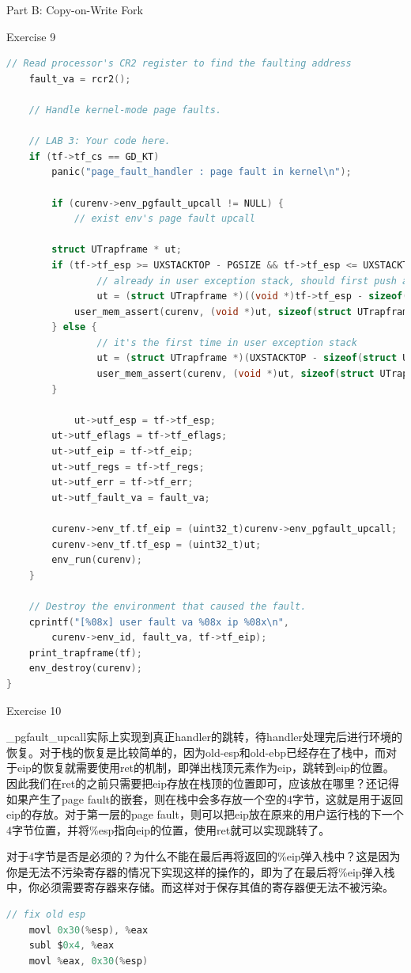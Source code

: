\documentclass[GBK,winfonts,a4paper,10pt]{ctexart}
\begin{document}
\begin{section}{Part B: Copy-on-Write Fork}
\begin{subsection}{Exercise 9}
\begin{lstlisting}[language=C]
	// Read processor's CR2 register to find the faulting address
	fault_va = rcr2();

	// Handle kernel-mode page faults.

	// LAB 3: Your code here.
	if (tf->tf_cs == GD_KT)
    	panic("page_fault_handler : page fault in kernel\n");
    
    	if (curenv->env_pgfault_upcall != NULL) {
    		// exist env's page fault upcall
		
   	 	struct UTrapframe * ut;
   	 	if (tf->tf_esp >= UXSTACKTOP - PGSIZE && tf->tf_esp <= UXSTACKTOP - 1) {
    			// already in user exception stack, should first push an empty 32-bit word
    			ut = (struct UTrapframe *)((void *)tf->tf_esp - sizeof(struct UTrapframe) - 4);
	 	   	user_mem_assert(curenv, (void *)ut, sizeof(struct UTrapframe) + 4, PTE_U | PTE_W);
  	  	} else {
    			// it's the first time in user exception stack
    			ut = (struct UTrapframe *)(UXSTACKTOP - sizeof(struct UTrapframe));
		    	user_mem_assert(curenv, (void *)ut, sizeof(struct UTrapframe), PTE_U | PTE_W);
   	 	}
    	
    		ut->utf_esp = tf->tf_esp;
   	 	ut->utf_eflags = tf->tf_eflags;
   	 	ut->utf_eip = tf->tf_eip;
		ut->utf_regs = tf->tf_regs;
		ut->utf_err = tf->tf_err;
		ut->utf_fault_va = fault_va;

		curenv->env_tf.tf_eip = (uint32_t)curenv->env_pgfault_upcall;
		curenv->env_tf.tf_esp = (uint32_t)ut;
   	 	env_run(curenv);
    } 

	// Destroy the environment that caused the fault.
	cprintf("[%08x] user fault va %08x ip %08x\n",
		curenv->env_id, fault_va, tf->tf_eip);
	print_trapframe(tf);
	env_destroy(curenv);
}
\end{lstlisting}
\end{subsection}

\begin{subsection}{Exercise 10}
\par
\_pgfault\_upcall实际上实现到真正handler的跳转，待handler处理完后进行环境的恢复。对于栈的恢复是比较简单的，因为old-esp和old-ebp已经存在了栈中，而对于eip的恢复就需要使用ret的机制，即弹出栈顶元素作为eip，跳转到eip的位置。因此我们在ret的之前只需要把eip存放在栈顶的位置即可，应该放在哪里？还记得如果产生了page fault的嵌套，则在栈中会多存放一个空的4字节，这就是用于返回eip的存放。对于第一层的page fault，则可以把eip放在原来的用户运行栈的下一个4字节位置，并将\%esp指向eip的位置，使用ret就可以实现跳转了。
\par
对于4字节是否是必须的？为什么不能在最后再将返回的\%eip弹入栈中？这是因为你是无法不污染寄存器的情况下实现这样的操作的，即为了在最后将\%eip弹入栈中，你必须需要寄存器来存储。而这样对于保存其值的寄存器便无法不被污染。
\begin{lstlisting}[language=C]
	// fix old esp
	movl 0x30(%esp), %eax
	subl $0x4, %eax
	movl %eax, 0x30(%esp)


\end{lstlisting}
\end{subsection}
\end{section}
\end{document}
